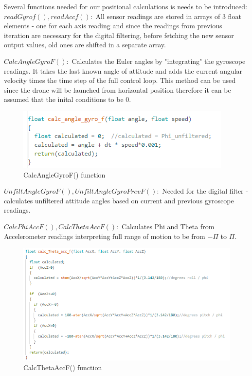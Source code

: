 Several functions needed for our positional calculations is needs to be introduced:
$readGyrof(), readAccf():$\newline
All sensor readings are stored in arrays of 3 float elements - one for each axis reading and since the readings from previous iteration are necessary for the digital filtering, before fetching the new sensor output values, old ones are shifted in a separate array.

$CalcAngleGyroF():$\newline
Calculates the Euler angles by "integrating" the gyroscope readings. It takes the last known angle of attitude and adds the current angular velocity times the time step of the full control loop. This method can be used since the drone will be launched from horizontal position therefore it can be assumed that the inital conditions to be 0.


\begin{figure}[H]
    \begin{center}
    \includegraphics[scale = 0.85]{pictures/IMU/calc_angle_gyro.png}
    \end{center}
    \caption{CalcAngleGyroF() function}
    \label{fig:my_label}
\end{figure}


$UnfiltAngleGyroF(), UnfiltAngleGyroPrevF():$\newline
Needed for the digital filter - calculates unfiltered attitude angles based on current and previous gyroscope readings.

$CalcPhiAccF(), CalcThetaAccF():$\newline
Calculates Phi and Theta from Accelerometer readings interpreting full range of motion to be from $-\Pi$ to $\Pi$.

\begin{figure}[H]
    \begin{center}
    \includegraphics[scale = 0.85]{pictures/IMU/calc_angle_theta.png}
    \end{center}
    \caption{CalcThetaAccF() function}
    \label{fig:my_label}
\end{figure}


